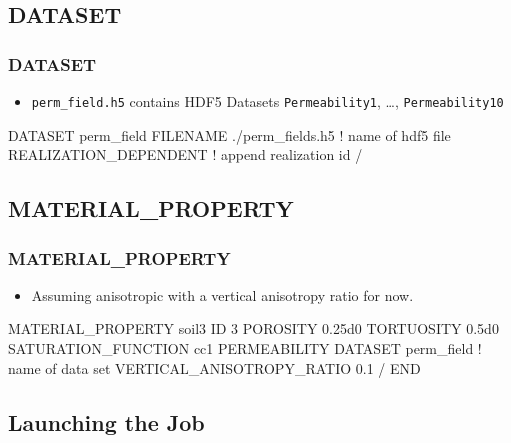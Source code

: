 \documentclass{beamer}
\newcommand\bluecomment[1]{{{\color{blue} #1}}}
\newcommand\magentacomment[1]{{{\color{magenta} #1}}}
\begin{document}
\subsection{DATASET}

\begin{frame}\frametitle{DATASET}

\begin{itemize}
  \item \verb=perm_field.h5= contains HDF5 Datasets \verb=Permeability1=, \dots, \verb=Permeability10=
\end{itemize}

\begin{semiverbatim}

DATASET perm_field
  FILENAME ./perm_fields.h5   \bluecomment{! name of hdf5 file}
  REALIZATION_DEPENDENT       \bluecomment{! append realization id}
/
\end{semiverbatim}

\end{frame}

\subsection{MATERIAL\_PROPERTY}

\begin{frame}[fragile]\frametitle{MATERIAL\_PROPERTY}

\begin{itemize}
  \item Assuming anisotropic with a vertical anisotropy ratio for now.
\end{itemize}

\begin{semiverbatim}
MATERIAL_PROPERTY soil3
  ID 3
  POROSITY 0.25d0
  TORTUOSITY 0.5d0
  SATURATION_FUNCTION cc1
  PERMEABILITY
    \magentacomment{DATASET perm_field}      \bluecomment{! name of data set}
    \magentacomment{VERTICAL_ANISOTROPY_RATIO 0.1}
  /
END
\end{semiverbatim}

\end{frame}

\subsection{Launching the Job}
\end{document}

